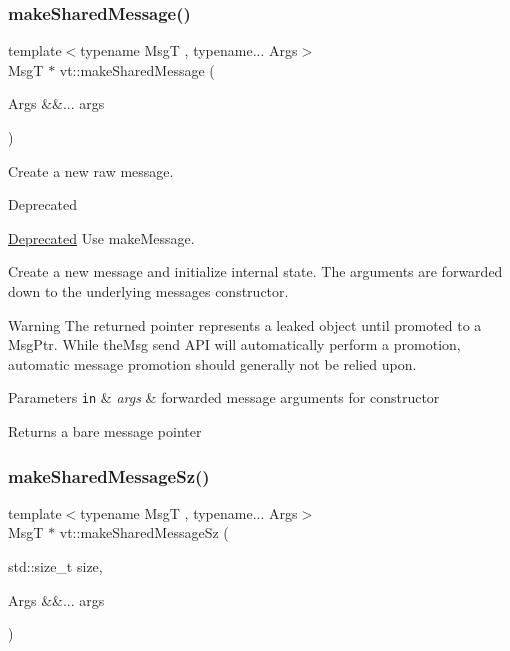 \subsubsection{\texorpdfstring{make\+Shared\+Message()}{makeSharedMessage()}}
{\footnotesize\ttfamily template$<$typename MsgT , typename... Args$>$ \\
MsgT $\ast$ vt\+::make\+Shared\+Message (\begin{DoxyParamCaption}\item[{Args \&\&...}]{args }\end{DoxyParamCaption})}



Create a new \textquotesingle{}raw\textquotesingle{} message. 

\begin{DoxyRefDesc}{Deprecated}
\item[\hyperlink{deprecated__deprecated000007}{Deprecated}]Use {\ttfamily make\+Message}. \end{DoxyRefDesc}
Create a new message and initialize internal state. The arguments are forwarded down to the underlying message\textquotesingle{}s constructor.

\begin{DoxyWarning}{Warning}
The returned pointer represents a leaked object until \textquotesingle{}promoted\textquotesingle{} to a Msg\+Ptr. While {\ttfamily the\+Msg} send A\+PI will automatically perform a promotion, automatic message promotion should generally not be relied upon.
\end{DoxyWarning}

\begin{DoxyParams}[1]{Parameters}
\mbox{\tt in}  & {\em args} & forwarded message arguments for constructor\\
\hline
\end{DoxyParams}
\begin{DoxyReturn}{Returns}
a bare message pointer 
\end{DoxyReturn}
\mbox{\label{namespacevt_a1cad9543b26045826f0fa5d17a2dfd2f}} 
\subsubsection{\texorpdfstring{make\+Shared\+Message\+Sz()}{makeSharedMessageSz()}}
{\footnotesize\ttfamily template$<$typename MsgT , typename... Args$>$ \\
MsgT $\ast$ vt\+::make\+Shared\+Message\+Sz (\begin{DoxyParamCaption}\item[{std\+::size\+\_\+t}]{size,  }\item[{Args \&\&...}]{args }\end{DoxyParamCaption})}



